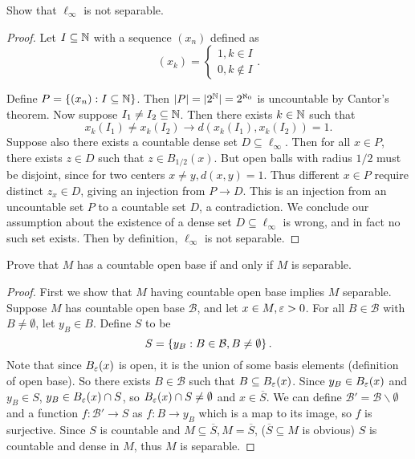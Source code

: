 \documentclass{exam}
\begin{document}
\begin{questions}
    \newpage
    \question Show that $\ell_\infty$ is not separable.
    \begin{proof}
        Let $I\subseteq \mathbb {N}$ with a sequence $(x_n)$ defined as
        $$(x_k) = \begin{cases}
            1, k\in I \\
            0, k\not\in I
        \end{cases}.$$

        Define $P = \left \{ (x_n) : I\subseteq\mathbb {N} \right \}$. Then $|P| = |2^\mathbb {N}| = 2^{\aleph_0}$ is uncountable by Cantor's theorem. Now suppose
        $I_1 \neq I_2 \subseteq \mathbb {N}$. Then there exists $k\in\mathbb {N}$ such that
        $$x_k(I_1) \neq x_k(I_2) \rightarrow d(x_k(I_1), x_k(I_2)) = 1.$$
        Suppose also there exists a countable dense set $D \subseteq \ell_\infty$. Then for all $x\in P$, there exists $z\in D$ such that
        $z \in B_{1/2}(x)$. But open balls with radius $1/2$ must be disjoint, since for two centers $x \neq y, d(x, y) = 1$. Thus different $x\in P$
        require distinct $z_x \in D$, giving an injection from $P \to D$. This is an injection from an uncountable set $P$ to a countable set $D$, 
        a contradiction. We conclude our assumption about the existence of a dense set $D\subseteq \ell_\infty$ is wrong, and in fact no such 
        set exists. Then by definition, $\ell_\infty$ is not separable.
    \end{proof}


    \newpage
    \question Prove that $M$ has a countable open base if and only if $M$ is separable.
    \begin{proof}
        First we show that $M$ having countable open base implies $M$ separable. Suppose $M$ has countable open base $\mathcal{B}$, and let
        $x\in M, \varepsilon > 0$. For all $B\in\mathcal{B}$ with $B \neq \emptyset$, let $y_B\in B$. Define $S$ to be
        $$S = \left \{ y_B : B\in\mathcal{B}, B\neq \emptyset \right \}.$$
        Note that since $B_\varepsilon(x)$ is open, it is the union of some basis elements (definition of open base). So there exists $B\in\mathcal{B}$ such that $B\subseteq B_\varepsilon(x)$. Since
        $y_B\in B_\varepsilon(x)$ and $y_B\in S$, $y_B\in B_\varepsilon(x)\cap S$, so $B_\varepsilon(x)\cap S \neq \emptyset$ and $x\in \overline{S}$. We can define $\mathcal{B}' = \mathcal{B}\backslash\emptyset$ 
        and a function $f: \mathcal{B}'\to S$ as $f: B\to y_B$ which is a map to its image, so $f$ is surjective. Since $S$ is countable and
        $M\subseteq \overline{S}, M = \overline{S}$, ($\overline{S}\subseteq M$ is obvious) $S$ is countable and dense in $M$, thus $M$ is separable.



\end{proof}
\end{questions}
\end{document}
